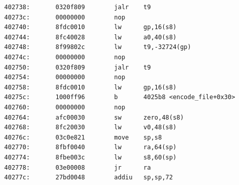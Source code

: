 \documentclass[11pt]{article}
\begin{document}
\begin{verbatim}
  402738:       0320f809        jalr    t9
  40273c:       00000000        nop
  402740:       8fdc0010        lw      gp,16(s8)
  402744:       8fc40028        lw      a0,40(s8)
  402748:       8f99802c        lw      t9,-32724(gp)
  40274c:       00000000        nop
  402750:       0320f809        jalr    t9
  402754:       00000000        nop
  402758:       8fdc0010        lw      gp,16(s8)
  40275c:       1000ff96        b       4025b8 <encode_file+0x30>
  402760:       00000000        nop
  402764:       afc00030        sw      zero,48(s8)
  402768:       8fc20030        lw      v0,48(s8)
  40276c:       03c0e821        move    sp,s8
  402770:       8fbf0040        lw      ra,64(sp)
  402774:       8fbe003c        lw      s8,60(sp)
  402778:       03e00008        jr      ra
  40277c:       27bd0048        addiu   sp,sp,72


\end{verbatim}
\end{document}
